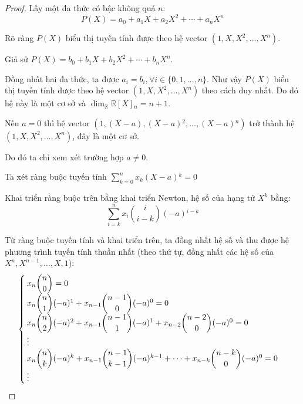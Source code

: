 \documentclass[class=linearalgebra,crop=false]{standalone}
\begin{document}
\begin{proof}Lấy một đa thức có bậc không quá $n$:
    \[ P(X) = a_{0} + a_{1}X + a_{2}X^{2} + \cdots + a_{n}X^{n} \]
    \par Rõ ràng $P(X)$ biểu thị tuyến tính được theo hệ vector $(1, X, X^{2}, \ldots, X^{n})$.
    \par Giả sử $P(X) = b_{0} + b_{1}X + b_{2}X^{2} + \cdots + b_{n}X^{n}$.
    \par Đồng nhất hai đa thức, ta được $a_{i} = b_{i}, \forall i\in\{0, 1, \ldots, n\}$. Như vậy $P(X)$ biểu thị tuyến tính được theo hệ vector $(1, X, X^{2}, \ldots, X^{n})$ theo cách duy nhất. Do đó hệ này là một cơ sở và $\dim_{\mathbb{R}}\mathbb{R}[X]{}_{n} = n + 1$.

    \par Nếu $a = 0$ thì hệ vector $(1, (X - a), (X - a){}^{2}, \ldots, (X - a){}^{n})$ trở thành hệ $(1, X, X^{2}, \ldots, X^{n})$, đây là một cơ sở.
    \par Do đó ta chỉ xem xét trường hợp $a\ne 0$.
    \par Ta xét ràng buộc tuyến tính $\displaystyle\sum^{n}_{k=0}x_{k}(X-a){}^{k} = 0$
    \par Khai triển ràng buộc trên bằng khai triển Newton, hệ số của hạng tử $X^{k}$ bằng:
    \[ \sum^{n}_{i=k}x_{i}\binom{i}{i-k}(-a){}^{i-k} \]
    \par Từ ràng buộc tuyến tính và khai triển trên, ta đồng nhất hệ số và thu được hệ phương trình tuyến tính thuần nhất (theo thứ tự, đồng nhất các hệ số của $X^{n}, X^{n-1}, \ldots, X, 1$):
    \[
        \begin{cases}
            x_{n}\dbinom{n}{0} = 0                                                                                              \\
            x_{n}\dbinom{n}{1}(-a){}^{1} + x_{n-1}\dbinom{n-1}{0}(-a){}^{0} = 0                                                 \\
            x_{n}\dbinom{n}{2}(-a){}^{2} + x_{n-1}\dbinom{n-1}{1}(-a){}^{1} + x_{n-2}\dbinom{n-2}{0}(-a){}^{0} = 0              \\
            \vdots                                                                                                              \\
            x_{n}\dbinom{n}{k}(-a){}^{k} + x_{n-1}\dbinom{n-1}{k-1}(-a){}^{k-1} + \cdots + x_{n-k}\dbinom{n-k}{0}(-a){}^{0} = 0 \\
            \vdots                                                                                                              \\

\end{cases}\]
\end{proof}
\end{document}
